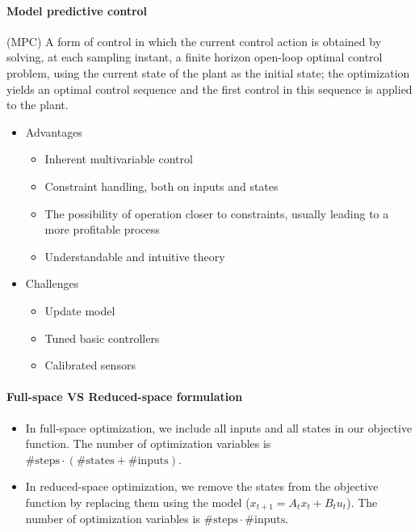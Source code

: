 \paragraph{Model predictive control} (MPC) A form of control in which the current control action is obtained by solving, at each sampling instant, a finite horizon open-loop optimal control problem, using the current state of the plant as the initial state; the optimization yields an optimal control sequence and the first control in this sequence is applied to the plant.
\begin{itemize}[nolistsep,noitemsep]
    \item Advantages
    \begin{itemize}[nolistsep,noitemsep]
        \item Inherent multivariable control
        \item Constraint handling, both on inputs and states
        \item The possibility of operation closer to constraints, usually leading to a more profitable process
        \item Understandable and intuitive theory
    \end{itemize}
    \item Challenges
    \begin{itemize}[nolistsep,noitemsep]
        \item Update model
        \item Tuned basic controllers
        \item Calibrated sensors
    \end{itemize}
\end{itemize}

\paragraph{Full-space VS Reduced-space formulation}  
 \begin{itemize}[nolistsep,noitemsep]
     \item In full-space optimization, we include all inputs and all states in our objective function. The number of optimization variables is $\#\mathrm{steps} \cdot (\#\mathrm{states} + \#\mathrm{inputs})$.
     \item In reduced-space optimization, we remove the states from the objective function by replacing them using the model ($x_{t+1} = A_t x_t + B_t u_t$). The number of optimization variables is $\#\mathrm{steps} \cdot \#\mathrm{inputs}$.
 \end{itemize}

